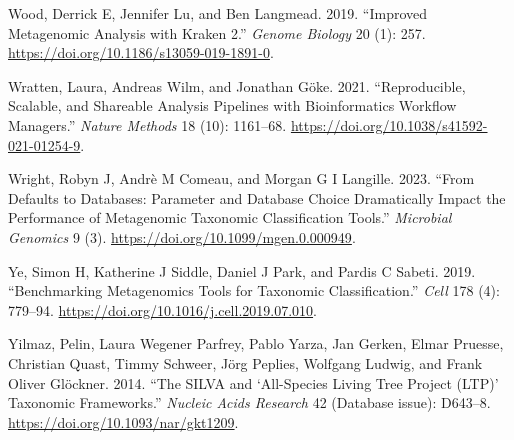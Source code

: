 \documentclass[
]{article}
\newlength{\cslhangindent}
\newlength{\cslentryspacingunit} %
\newenvironment{CSLReferences}[2] %
 {%
  \setlength{\parindent}{0pt}
  \ifodd #1
  \let\oldpar\par
  \def\par{\hangindent=\cslhangindent\oldpar}
  \fi
  \setlength{\parskip}{#2\cslentryspacingunit}
 }%
 {}
\begin{document}
\begin{CSLReferences}{1}{0}
\leavevmode{}%
Wood, Derrick E, Jennifer Lu, and Ben Langmead. 2019. {``Improved
Metagenomic Analysis with Kraken 2.''} \emph{Genome Biology} 20 (1):
257. \url{https://doi.org/10.1186/s13059-019-1891-0}.

\leavevmode{}%
Wratten, Laura, Andreas Wilm, and Jonathan Göke. 2021. {``Reproducible,
Scalable, and Shareable Analysis Pipelines with Bioinformatics Workflow
Managers.''} \emph{Nature Methods} 18 (10): 1161--68.
\url{https://doi.org/10.1038/s41592-021-01254-9}.

\leavevmode{}%
Wright, Robyn J, Andrè M Comeau, and Morgan G I Langille. 2023. {``From
Defaults to Databases: Parameter and Database Choice Dramatically Impact
the Performance of Metagenomic Taxonomic Classification Tools.''}
\emph{Microbial Genomics} 9 (3).
\url{https://doi.org/10.1099/mgen.0.000949}.

\leavevmode{}%
Ye, Simon H, Katherine J Siddle, Daniel J Park, and Pardis C Sabeti.
2019. {``Benchmarking Metagenomics Tools for Taxonomic
Classification.''} \emph{Cell} 178 (4): 779--94.
\url{https://doi.org/10.1016/j.cell.2019.07.010}.

\leavevmode{}%
Yilmaz, Pelin, Laura Wegener Parfrey, Pablo Yarza, Jan Gerken, Elmar
Pruesse, Christian Quast, Timmy Schweer, Jörg Peplies, Wolfgang Ludwig,
and Frank Oliver Glöckner. 2014. {``The {SILVA} and {`All-Species Living
Tree Project ({LTP})'} Taxonomic Frameworks.''} \emph{Nucleic Acids
Research} 42 (Database issue): D643--8.
\url{https://doi.org/10.1093/nar/gkt1209}.

\end{CSLReferences}
\end{document}
